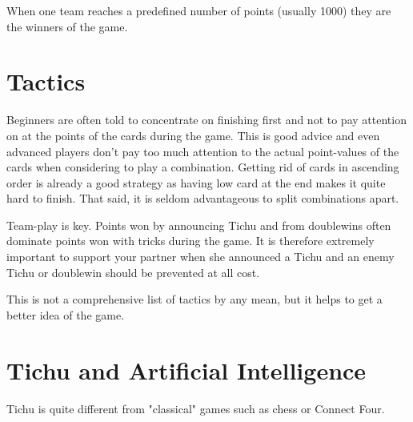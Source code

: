 When one team reaches a predefined number of points (usually 1000) they are the winners of the game.


\section{Tactics}
\label{sec:tactics}
Beginners are often told to concentrate on finishing first and not to pay attention on at the points of the cards during the game. This is good advice and even advanced players don't pay too much attention to the actual point-values of the cards when considering to play a combination. \newline
Getting rid of cards in ascending order is already a good strategy as having low card at the end makes it quite hard to finish. That said, it is seldom advantageous to split combinations apart.

Team-play is key. Points won by announcing Tichu and from doublewins often dominate points won with tricks during the game.
It is therefore extremely important to support your partner when she announced a Tichu and an enemy Tichu or doublewin should be prevented at all cost.

This is not a comprehensive list of tactics by any mean, but it helps to get a better idea of the game.


\section{Tichu and Artificial Intelligence}
Tichu is quite different from "classical" games such as chess or Connect Four.


